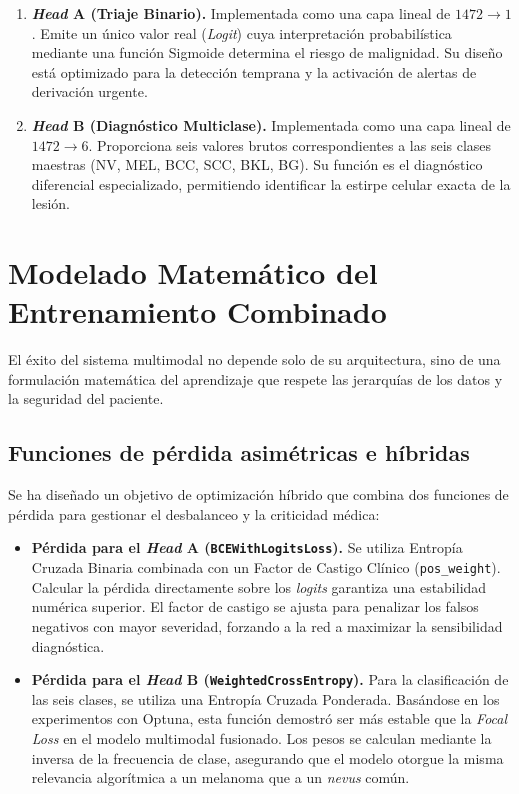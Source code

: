 \begin{enumerate}
	\item \textbf{\textit{Head} A (Triaje Binario).} Implementada como una capa lineal de $1472 \to 1$. Emite un único valor real (\textit{Logit}) cuya interpretación probabilística mediante una función Sigmoide determina el riesgo de malignidad. Su diseño está optimizado para la detección temprana y la activación de alertas de derivación urgente.
	
	\item \textbf{\textit{Head} B (Diagnóstico Multiclase).} Implementada como una capa lineal de $1472 \to 6$. Proporciona seis valores brutos correspondientes a las seis clases maestras (NV, MEL, BCC, SCC, BKL, BG). Su función es el diagnóstico diferencial especializado, permitiendo identificar la estirpe celular exacta de la lesión.
\end{enumerate}

\section{Modelado Matemático del Entrenamiento Combinado}

El éxito del sistema multimodal no depende solo de su arquitectura, sino de una formulación matemática del aprendizaje que respete las jerarquías de los datos y la seguridad del paciente.

\subsection{Funciones de pérdida asimétricas e híbridas}

Se ha diseñado un objetivo de optimización híbrido que combina dos funciones de pérdida para gestionar el desbalanceo y la criticidad médica:

\begin{itemize}
	\item \textbf{Pérdida para el \textit{Head} A (\texttt{BCEWithLogitsLoss}).} Se utiliza Entropía Cruzada Binaria combinada con un Factor de Castigo Clínico (\texttt{pos\_weight}). Calcular la pérdida directamente sobre los \textit{logits} garantiza una estabilidad numérica superior. El factor de castigo se ajusta para penalizar los falsos negativos con mayor severidad, forzando a la red a maximizar la sensibilidad diagnóstica.
	
	\item \textbf{Pérdida para el \textit{Head} B (\texttt{WeightedCrossEntropy}).} Para la clasificación de las seis clases, se utiliza una Entropía Cruzada Ponderada. Basándose en los experimentos con Optuna, esta función demostró ser más estable que la \textit{Focal Loss} en el modelo multimodal fusionado. Los pesos se calculan mediante la inversa de la frecuencia de clase, asegurando que el modelo otorgue la misma relevancia algorítmica a un melanoma que a un \textit{nevus} común.
\end{itemize}

